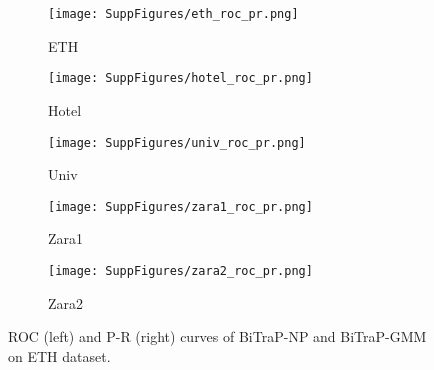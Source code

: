 \documentclass[letterpaper, 10 pt, conference]{ieeeconf}
\begin{document}
\begin{figure}[h!]
    \begin{subfigure}[h]{0.48\textwidth}
        \texttt{[image: SuppFigures/eth\_roc\_pr.png]}
        \caption{ETH}
        \label{fig:eth_roc_pr}
    \end{subfigure}
    \begin{subfigure}[h]{0.48\textwidth}
        \texttt{[image: SuppFigures/hotel\_roc\_pr.png]}
        \caption{Hotel}
        \label{fig:hotel_roc_pr}
    \end{subfigure}
    
    \begin{subfigure}[h]{0.48\textwidth}
        \texttt{[image: SuppFigures/univ\_roc\_pr.png]}
        \caption{Univ}
        \label{fig:univ_roc_pr}
    \end{subfigure}
    \begin{subfigure}[h]{0.48\textwidth}
        \texttt{[image: SuppFigures/zara1\_roc\_pr.png]}
        \caption{Zara1}
        \label{fig:zara1_roc_pr}
    \end{subfigure}
    
    \begin{subfigure}[h]{0.48\textwidth}
        \texttt{[image: SuppFigures/zara2\_roc\_pr.png]}
        \caption{Zara2}
        \label{fig:zara2_roc_pr}
    \end{subfigure}
    \caption{ROC (left) and P-R (right) curves of BiTraP-NP and BiTraP-GMM on ETH dataset.}
    \label{fig:roc_pr}
\end{figure}
\end{document}
